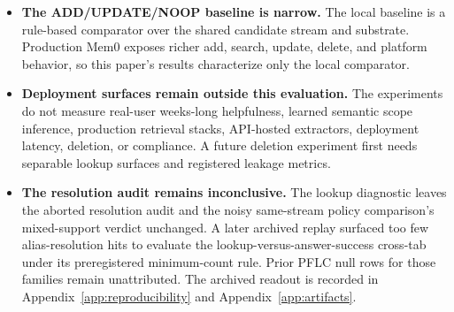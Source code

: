 \begin{itemize}
\item \textbf{The ADD/UPDATE/NOOP baseline is narrow.} The local baseline is a
rule-based comparator over the shared candidate stream and substrate.
Production Mem0 exposes richer add, search, update, delete, and platform
behavior, so this paper's results characterize only the local comparator.

\item \textbf{Deployment surfaces remain outside this evaluation.} The experiments do not
measure real-user weeks-long helpfulness, learned semantic scope inference,
production retrieval stacks, API-hosted extractors, deployment latency,
deletion, or compliance. A future deletion experiment first needs separable
lookup surfaces and registered leakage metrics.

\item \textbf{The resolution audit remains inconclusive.} The lookup diagnostic
leaves the aborted resolution audit and the noisy same-stream policy
comparison's mixed-support verdict unchanged. A later archived replay surfaced
too few alias-resolution hits to evaluate the lookup-versus-answer-success
cross-tab under its preregistered minimum-count rule. Prior PFLC null rows for
those families remain unattributed. The archived readout is recorded in
Appendix~\ref{app:reproducibility} and Appendix~\ref{app:artifacts}.
\end{itemize}
